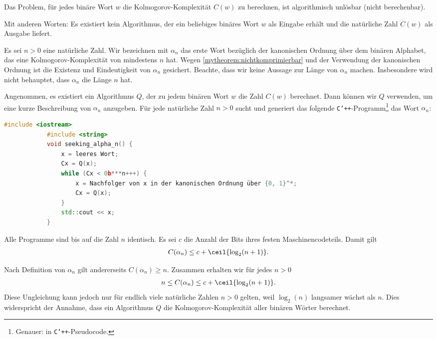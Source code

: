 \begin{mytheorem}\label{mytheorem:Knotcomputable}
	Das Problem, für jedes binäre Wort $w$ die Kolmogorov-Komplexität $C(w)$ zu berechnen, ist algorithmisch unlösbar (nicht berechenbar).

	\vspace{\baselineskip}
	Mit anderen Worten: Es existiert kein Algorithmus, der ein beliebiges binäres Wort $w$ als Eingabe erhält und die natürliche Zahl $C(w)$ als Ausgabe liefert.
	\begin{myproof}
		Es sei $n>0$ eine natürliche Zahl. Wir bezeichnen mit $\alpha_n$ das erste Wort bezüglich der kanonischen Ordnung über dem binären Alphabet, das eine Kolmogorov-Komplexität von mindestens $n$ hat.
		Wegen \cref{mytheorem:nichtkomprimierbar} und der Verwendung der kanonischen Ordnung ist die Existenz und Eindeutigkeit von $\alpha_n$ gesichert.
		Beachte, dass wir keine Aussage zur Länge von $\alpha_n$ machen. Insbesondere wird nicht behauptet, dass $\alpha_n$ die Länge $n$ hat.

		\vspace{\baselineskip}
		Angenommen, es existiert ein Algorithmus $Q$, der zu jedem binären Wort $w$ die Zahl $C(w)$ berechnet. Dann können wir $Q$ verwenden, um eine kurze Beschreibung von $\alpha_n$ anzugeben. Für jede natürliche Zahl $n>0$ sucht und generiert das folgende \texttt{C'++}-Programm\footnote{Genauer: in \texttt{C'++}-Pseudocode.} das Wort $\alpha_n$:
		\begin{lstlisting}[language=C++]
			#include <iostream>
			#include <string>
			void seeking_alpha_n() {
				x = leeres Wort;
				Cx = Q(x);
				while (Cx < 0b***n+++) {
					x = Nachfolger von x in der kanonischen Ordnung über {0, 1}^*;
					Cx = Q(x);
				}
				std::cout << x;
			}
        \end{lstlisting}
		Alle Programme  sind bis auf die Zahl $n$ identisch. Es sei $c$ die Anzahl der Bits ihres festen Maschinencodeteils. Damit gilt
		\begin{align*}
			C(\alpha_n)\leq c+\ceil{\log_2(n+1)}.
		\end{align*}

		\vspace{\baselineskip}
		Nach Definition von $\alpha_n$ gilt andererseits $C(\alpha_n)\geq n$. Zusammen erhalten wir für jedes $n>0$
		\begin{align*}
			n \leq C(\alpha_n) \leq c + \ceil{\log_2(n+1)}.
		\end{align*}
		Diese Ungleichung kann jedoch nur für endlich viele natürliche Zahlen $n>0$ gelten, weil $\log_2(n)$ langsamer wächst als $n$. Dies widerspricht der Annahme, dass ein Algorithmus $Q$ die Kolmogorov-Komplexität aller binären Wörter berechnet.
	\end{myproof}
\end{mytheorem}

